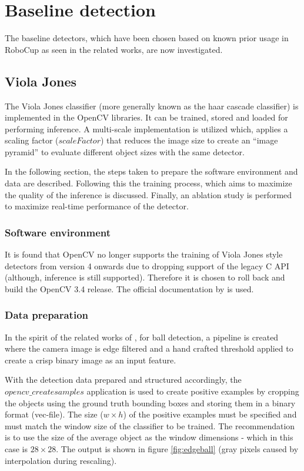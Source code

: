 \documentclass[a4paper,twoside,12pt]{report}
\begin{document}
\section{Baseline detection}

The baseline detectors, which have been chosen based on known prior usage in RoboCup as seen in the related works, are now investigated.

\subsection{Viola Jones}

The Viola Jones classifier (more generally known as the haar cascade classifier) is implemented in the OpenCV libraries. It can be trained, stored and loaded for performing inference. A multi-scale implementation is utilized which, applies a scaling factor ($scaleFactor$) that reduces the image size to create an ``image pyramid'' to evaluate different object sizes with the same detector. 

In the following section, the steps taken to prepare the software environment and data are described. Following this the training process, which aims to maximize the quality of the inference is discussed. Finally, an ablation study is performed to maximize real-time performance of the detector.

\subsubsection{Software environment}

It is found that OpenCV no longer supports the training of Viola Jones style detectors from version 4 onwards due to dropping support of the legacy C API (although, inference is still supported). Therefore it is chosen to roll back and build the OpenCV 3.4 release. The official documentation by \cite{vjdataset} is used.

\subsubsection{Data preparation}

In the spirit of the related works of \cite{robovj}, for ball detection, a pipeline is created where the camera image is edge filtered and a hand crafted threshold applied to create a crisp binary image as an input feature. 

With the detection data prepared and structured accordingly, the $opencv\_createsamples$ application is used to create positive examples by cropping the objects using the ground truth bounding boxes and storing them in a binary format (vec-file). The size ($w\times h$) of the positive examples must be specified and must match the window size of the classifier to be trained. The \cite{vjdataset} recommendation is to use the size of the average object as the window dimensions - which in this case is $28\times 28$. The output is shown in figure \ref{fig:edgeball} (gray pixels caused by interpolation during rescaling).
\end{document}
